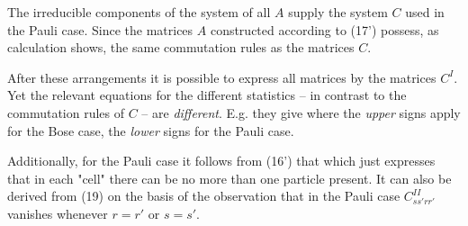 \begin{paper}{1}
The irreducible components of the system of all $A$ supply the system $C$ used in the Pauli case. Since the matrices $A$ constructed according to (17') possess, as calculation shows, the same commutation rules as the matrices $C$.

After these arrangements it is possible to express all matrices by the matrices $C^I$. Yet the relevant equations for the different statistics  -- in contrast to the commutation rules of $C$ -- are \textit{different}. E.g. they give
where the \textit{upper} signs apply for the Bose case, the \textit{lower} signs for the Pauli case.

Additionally, for the Pauli case it follows from (16') that
which just expresses that in each "cell" there can be no more than one particle present. It can also be derived from (19) on the basis of the observation that in the Pauli case $C^{II}_{ss'rr'}$ vanishes whenever $r=r'$ or $s=s'$.
\end{paper}